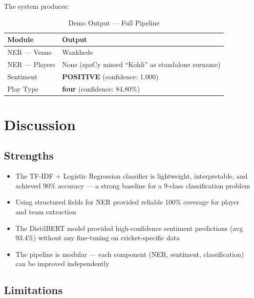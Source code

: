 \documentclass[12pt,a4paper]{article}
\begin{document}
The system produces:

\begin{table}[H]
\centering
\caption{Demo Output — Full Pipeline}
\begin{tabular}{ll}
\toprule
\textbf{Module}  & \textbf{Output} \\
\midrule
NER — Venue      & Wankhede \\
NER — Players    & None (spaCy missed ``Kohli'' as standalone surname) \\
Sentiment        & \textbf{POSITIVE} (confidence: 1.000) \\
Play Type        & \textbf{four} (confidence: 84.80\%) \\
\bottomrule
\end{tabular}
\end{table}

\section{Discussion}

\subsection{Strengths}

\begin{itemize}[leftmargin=1.5em]
  \item The TF-IDF + Logistic Regression classifier is lightweight, interpretable, and achieved 90\% accuracy — a strong baseline for a 9-class classification problem
  \item Using structured fields for NER provided reliable 100\% coverage for player and team extraction
  \item The DistilBERT model provided high-confidence sentiment predictions (avg 93.4\%) without any fine-tuning on cricket-specific data
  \item The pipeline is modular — each component (NER, sentiment, classification) can be improved independently
\end{itemize}

\subsection{Limitations}
\end{document}

